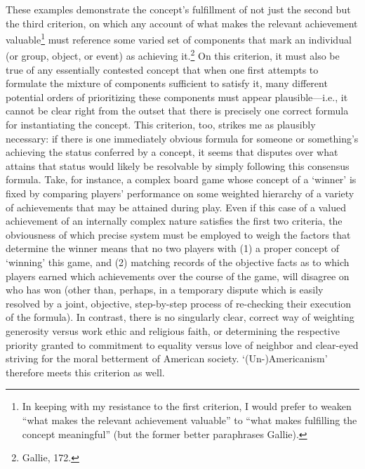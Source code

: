 These examples demonstrate the concept's fulfillment of not just the
second but the third criterion, on which any account of what makes the
relevant achievement valuable\footnote{In keeping with my resistance to
  the first criterion, I would prefer to weaken ``what makes the
  relevant achievement valuable'' to ``what makes fulfilling the concept
  meaningful'' (but the former better paraphrases Gallie).} must
reference some varied set of components that mark an individual (or
group, object, or event) as achieving it.\footnote{Gallie, 172.} On this
criterion, it must also be true of any essentially contested concept
that when one first attempts to formulate the mixture of components
sufficient to satisfy it, many different potential orders of
prioritizing these components must appear plausible---i.e., it cannot be
clear right from the outset that there is precisely one correct formula
for instantiating the concept. This criterion, too, strikes me as
plausibly necessary: if there is one immediately obvious formula for
someone or something's achieving the status conferred by a concept, it
seems that disputes over what attains that status would likely be
resolvable by simply following this consensus formula. Take, for
instance, a complex board game whose concept of a `winner' is fixed by
comparing players' performance on some weighted hierarchy of a variety
of achievements that may be attained during play. Even if this case of a
valued achievement of an internally complex nature satisfies the first
two criteria, the obviousness of which precise system must be employed
to weigh the factors that determine the winner means that no two players
with (1) a proper concept of `winning' this game, and (2) matching
records of the objective facts as to which players earned which
achievements over the course of the game, will disagree on who has won
(other than, perhaps, in a temporary dispute which is easily resolved by
a joint, objective, step-by-step process of re-checking their execution
of the formula). In contrast, there is no singularly clear, correct way
of weighting generosity versus work ethic and religious faith, or
determining the respective priority granted to commitment to equality
versus love of neighbor and clear-eyed striving for the moral betterment
of American society. `(Un-)Americanism' therefore meets this criterion
as well.

